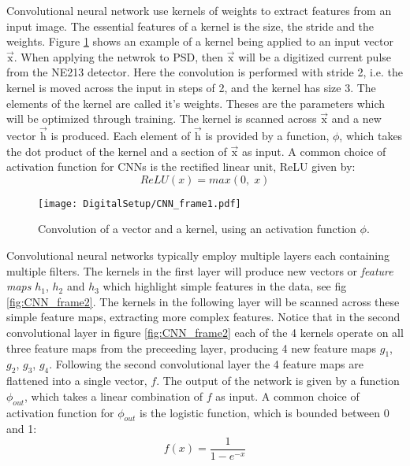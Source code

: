 \documentclass[main.tex]{subfiles}
\begin{document}
Convolutional neural network use kernels of weights to extract features from an input image. The essential features of a kernel is the size, the stride and the weights. Figure \ref{fig:CNN_frame1} shows an example of a kernel being applied to an input vector $\vec{\textrm{x}}$. When applying the netwrok to PSD, then $\vec{\textrm{x}}$ will be a digitized current pulse from the NE213 detector. Here the convolution is performed with stride 2, i.e. the kernel is moved across the input in steps of 2, and the kernel has size 3. The elements of the kernel are called it's weights. Theses are the parameters which will be optimized through training. The kernel is scanned across $\vec{\textrm{x}}$ and a new vector $\vec{\textrm{h}}$ is produced. Each element of $\vec{\textrm{h}}$ is provided by a function, $\phi$, which takes the dot product of the kernel and a section of $\vec{\textrm{x}}$ as input. A common choice of activation function for CNNs is the rectified linear unit, ReLU given by:
\begin{equation}
	ReLU(x) = max(0,\;x)
\end{equation}

\begin{figure}[ht!]
    \centering
        \texttt{[image: DigitalSetup/CNN\_frame1.pdf]}
        \caption[Convolution of a vector and a kernel, producing a new vector or feature map.]{Convolution of a vector and a kernel, using an activation function $\phi$.}
    \label{fig:CNN_frame1} 
\end{figure}

Convolutional neural networks typically employ multiple layers each containing multiple filters. The kernels in the first layer will produce new vectors or \textit{feature maps} $h_1$, $h_2$ and $h_3$ which highlight simple features in the data, see fig \ref{fig:CNN_frame2}. The kernels in the following layer will be scanned across these simple feature maps, extracting more complex features. Notice that in the second convolutional layer in figure \ref{fig:CNN_frame2} each of the 4 kernels operate on all three feature maps from the preceeding layer, producing 4 new feature maps $g_1$, $g_2$, $g_3$, $g_4$. Following the second convolutional layer the 4 feature maps are flattened into a single vector, $f$. The output of the network is given by a function $\phi_{out}$, which takes a linear combination of $f$ as input. A common choice of activation function for $\phi_{out}$ is the logistic function, which is bounded between 0 and 1:
\begin{equation}
	f(x) = \frac{1}{1-e^{-x}}
\end{equation}
\end{document}

